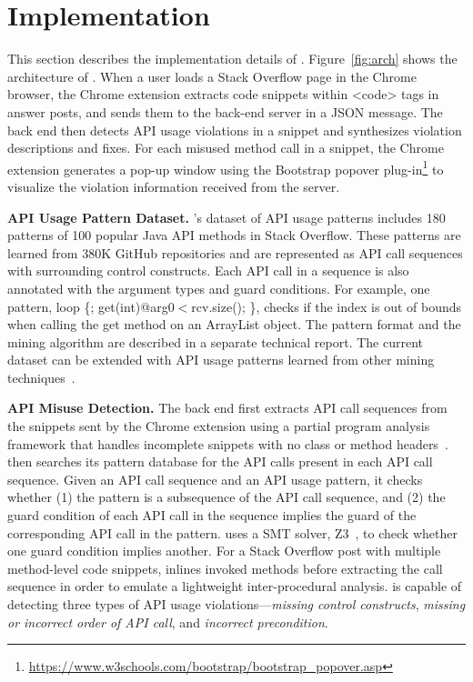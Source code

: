 \section{Implementation}
\label{sec:implementation}

This section describes the implementation details of {\tool}. Figure~\ref{fig:arch} shows the architecture of {\tool}.  When a user loads a Stack Overflow page in the Chrome browser, the Chrome extension extracts code snippets within {\ttt <code>} tags in answer posts, and sends them to the back-end server in a {\ttt JSON} message. The back end then detects API usage violations in a snippet and synthesizes violation descriptions and fixes. For each misused method call in a snippet, the Chrome extension generates a pop-up window using the Bootstrap popover plug-in\footnote{\url{https://www.w3schools.com/bootstrap/bootstrap_popover.asp}} to visualize the violation information received from the server.

{\bf API Usage Pattern Dataset.} {\tool}'s dataset of API usage patterns includes 180 patterns of 100 popular Java API methods in Stack Overflow. These patterns are learned from 380K GitHub repositories and are represented as API call sequences with surrounding control constructs. Each API call in a sequence is also annotated with the argument types and guard conditions. For example, one pattern, {\ttt loop \{; get(int)@arg0$<$rcv.size(); \}}, checks if the index is out of bounds when calling the {\ttt get} method on an {\ttt ArrayList} object. The pattern format and the mining algorithm are described in a separate technical report. The current dataset can be extended with API usage patterns learned from other mining techniques~\cite{gruska2010learning, wang2013mining, zhong2009mapo, Nguyen09}. 

{\bf API Misuse Detection.} The back end first extracts API call sequences from the snippets sent by the Chrome extension using a partial program analysis framework that handles incomplete snippets with no class or method headers~\cite{subramanian2014live}. {\tool} then searches its pattern database for the API calls present in each API call sequence. Given an API call sequence and an API usage pattern, it checks whether (1)  the pattern is a subsequence of the API call sequence, and (2) the guard condition of each API call in the sequence implies the guard of the corresponding API call in the pattern. {\tool} uses a SMT solver, Z3~\cite{de2008z3}, to check whether one guard condition implies another. For a Stack Overflow post with multiple method-level code snippets, {\tool} inlines invoked methods before extracting the call sequence in order to emulate a lightweight inter-procedural analysis. {\tool} is capable of detecting three types of API usage violations---{\em missing control constructs}, {\em missing or incorrect order of API call}, and {\em incorrect precondition}.

